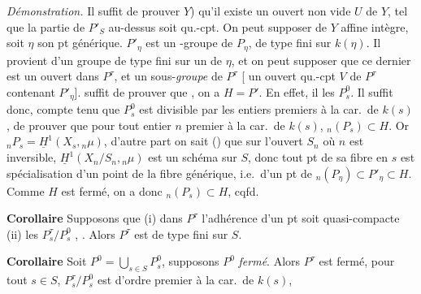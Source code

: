 \documentclass[11pt,a4paper]{article}
\begin{document}
\textit{Démonstration.} Il suffit de prouver  \ill{} $Y$) qu'il existe un ouvert non vide $U$ de $Y$, tel que la partie de $P'_S$ au-dessus soit qu.-cpt. On peut supposer de  $Y$ affine intègre, soit $\eta$ son pt générique.  $P'_\eta$ est un -groupe  de $P_\eta$, de type fini sur $k(\eta)$. Il provient d'un groupe  de type fini sur un  de $\eta$, et on peut supposer  que ce dernier est un ouvert dans $P^\tau$, et  un sous-\emph{groupe}  de $P^\tau$ [ un ouvert qu.-cpt $V$ de $P^\tau$ contenant $P'_\eta$].
  suffit de prouver que \struck{\ill{} \ill{}}   , on a $H = P'$. En effet, il \struck{\ill{}} \ill{} les $P_s^0$. Il suffit donc, compte tenu que $P_s^0$ est divisible par les entiers premiers à la car.\ de $k(s)$, de prouver que  pour tout entier $n$ premier à la car.\ de $k(s)$, ${}_n(P_s) \subset H$. Or ${}_nP_s = \underline{H}^1(X_s, {}_n\mu)$, d'autre part on sait () que sur l'ouvert $S_n$ où $n$ est inversible, $\underline{H}^1(X_n/S_n, {}_n\mu)$ est un \struck{\ill{} \ill{}} schéma  sur $S$, donc tout pt de sa fibre en $s$ est spécialisation d'un point de la fibre générique, i.e.\ d'un pt de ${}_n(P_\eta) \subset P'_\eta \subset H$. Comme $H$ est fermé, on a donc ${}_n(P_s) \subset H$, cqfd.

\textbf{Corollaire} \quad Supposons que (i)  \ill{} dans $P^\tau$ \struck{\ill{}} l'adhérence d'un pt soit quasi-compacte (ii) les $P_s^\tau / P_s^0$ , . Alors $P^\tau$ est de type fini sur $S$.

\textbf{Corollaire} \quad Soit $P^0 = \bigcup_{s \in S} P_s^0$, supposons $P^0$ \emph{fermé}. Alors $P^\tau$ est fermé,   \struck{\ill{}} pour tout $s \in S$, $P_s^\tau / P_s^0$ est d'ordre premier à la car.\ de $k(s)$, 
\end{document}
